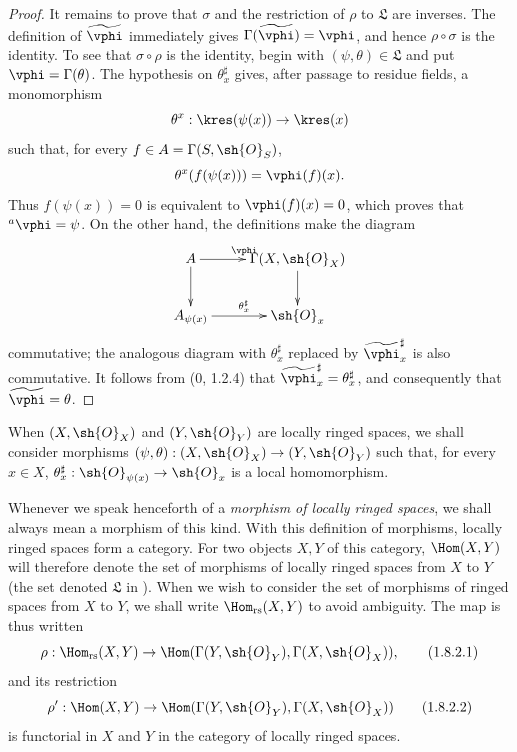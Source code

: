 \begin{proof}
It remains to prove that $\sigma$ and the restriction of $\rho$ to
$\mathfrak{L}$ are inverses.  The definition of
$\widetilde{\vphi}$ immediately gives
$\Gamma(\widetilde{\vphi})=\vphi$, and hence
$\rho\circ\sigma$ is the identity.  To see that $\sigma\circ\rho$ is
the identity, begin with $(\psi,\theta)\in\mathfrak{L}$ and put
$\vphi=\Gamma(\theta)$.  The hypothesis on $\theta_x^\sharp$ gives,
after passage to residue fields, a monomorphism
\[
  \theta^x:\kres(\psi(x))\to\kres(x)
\]
such that, for every $f\in A=\Gamma(S,\sh{O}_S)$,
\[
  \theta^x(f(\psi(x)))=\vphi(f)(x).
\]
Thus $f(\psi(x))=0$ is equivalent to $\vphi(f)(x)=0$, which proves
that ${}^a\vphi=\psi$.  On the other hand, the definitions make the
diagram
\[
  \xymatrix{
    A\ar[r]^\vphi\ar[d] &
    \Gamma(X,\sh{O}_X)\ar[d]\\
    A_{\psi(x)}\ar[r]^{\theta_x^\sharp} &
    \sh{O}_x
  }
\]
commutative; the analogous diagram with $\theta_x^\sharp$ replaced
by $\widetilde{\vphi}_x^\sharp$ is also commutative.  It follows from
(0, 1.2.4) that
$\widetilde{\vphi}_x^\sharp=\theta_x^\sharp$, and consequently that
$\widetilde{\vphi}=\theta$.
\end{proof}

\begin{env}[1.8.2]
\label{ega2:addendum:I.1.8.2}
When $(X,\sh{O}_X)$ and $(Y,\sh{O}_Y)$ are locally ringed spaces, we
shall consider morphisms
$(\psi,\theta):(X,\sh{O}_X)\to(Y,\sh{O}_Y)$ such that, for every
$x\in X$, $\theta_x^\sharp:\sh{O}_{\psi(x)}\to\sh{O}_x$ is a local
homomorphism.

Whenever we speak henceforth of a
\emph{morphism of locally ringed
spaces}, we shall always mean a morphism of this kind.  With this
definition of morphisms, locally ringed spaces form a category.  For
two objects $X,Y$ of this category, $\Hom(X,Y)$ will therefore denote
the set of morphisms of locally ringed spaces from $X$ to $Y$ (the set
denoted $\mathfrak{L}$ in ).  When we wish to consider
the set of morphisms of ringed spaces from $X$ to $Y$, we shall write
$\Hom_{\mathrm{rs}}(X,Y)$ to avoid ambiguity.  The map
 is thus written
\begin{equation}
\label{ega2:addendum:I.1.8.2.1}
  \rho:\Hom_{\mathrm{rs}}(X,Y)
  \to\Hom(\Gamma(Y,\sh{O}_Y),\Gamma(X,\sh{O}_X)),
\tag{1.8.2.1}
\end{equation}
and its restriction
\begin{equation}
\label{ega2:addendum:I.1.8.2.2}
  \rho':\Hom(X,Y)
  \to\Hom(\Gamma(Y,\sh{O}_Y),\Gamma(X,\sh{O}_X))
\tag{1.8.2.2}
\end{equation}
is functorial in $X$ and $Y$ in the category of locally ringed spaces.
\end{env}

